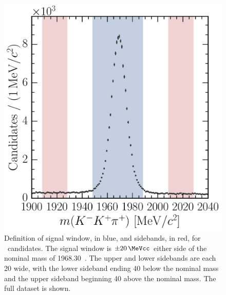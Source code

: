 \begin{figure}
  \centering
  \includegraphics[width=\textwidth]{figures/production/fitting/DsToKKpi_mass_offline_selection_regions}
  \caption{%
    Definition of signal window, in blue, and sidebands, in red, for 
    \DspTophipi\ candidates.
    The signal window is $\pm\SI{20}{\MeVcc}$ either side of the nominal 
    \PDsplus mass of \SI{1968.30}{\MeVcc}~\cite{PDG2014}.
    The upper and lower sidebands are each \SI{20}{\MeVcc} wide, with the lower 
    sideband ending \SI{40}{\MeVcc} below the nominal \PDsplus mass and the 
    upper sideband beginning \SI{40}{\MeVcc} above the nominal \PDsplus mass.
    The full dataset is shown.
  }
  \label{fig:prod:fitting:regions:DsToKKpi}
\end{figure}

